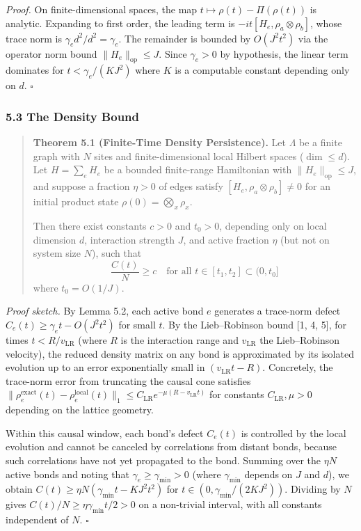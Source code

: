 \documentclass[
]{article}
\begin{document}
\emph{Proof.} On finite-dimensional spaces, the map
\(t \mapsto \rho(t) - \Pi(\rho(t))\) is analytic. Expanding to first
order, the leading term is \(-it[H_e, \rho_a \otimes \rho_b]\), whose
trace norm is \(\gamma_e d^2 / d^2 = \gamma_e\). The remainder is
bounded by \(O(J^2 t^2)\) via the operator norm bound
\(\|H_e\|_{\text{op}} \leq J\). Since \(\gamma_e > 0\) by hypothesis,
the linear term dominates for \(t < \gamma_e / (KJ^2)\) where \(K\) is a
computable constant depending only on \(d\). \(\square\)

\subsubsection{5.3 The Density Bound}\label{the-density-bound}

\begin{quote}
\textbf{Theorem 5.1 (Finite-Time Density Persistence).} Let \(\Lambda\)
be a finite graph with \(N\) sites and finite-dimensional local Hilbert
spaces (\(\dim \leq d\)). Let \(H = \sum_e H_e\) be a bounded
finite-range Hamiltonian with \(\|H_e\|_{\text{op}} \leq J\), and
suppose a fraction \(\eta > 0\) of edges satisfy
\([H_e, \rho_a \otimes \rho_b] \neq 0\) for an initial product state
\(\rho(0) = \bigotimes_x \rho_x\).

Then there exist constants \(c > 0\) and \(t_0 > 0\), depending only on
local dimension \(d\), interaction strength \(J\), and active fraction
\(\eta\) (but not on system size \(N\)), such that
\[\frac{C(t)}{N} \geq c \quad \text{for all } t \in [t_1, t_2] \subset (0, t_0]\]
where \(t_0 = O(1/J)\).
\end{quote}

\emph{Proof sketch.} By Lemma 5.2, each active bond \(e\) generates a
trace-norm defect \(C_e(t) \geq \gamma_e t - O(J^2 t^2)\) for small
\(t\). By the Lieb--Robinson bound {[}1, 4, 5{]}, for times
\(t < R / v_{\text{LR}}\) (where \(R\) is the interaction range and
\(v_{\text{LR}}\) the Lieb--Robinson velocity), the reduced density
matrix on any bond is approximated by its isolated evolution up to an
error exponentially small in \((v_{\text{LR}} t - R)\). Concretely, the
trace-norm error from truncating the causal cone satisfies
\(\|\rho_e^{\text{exact}}(t) - \rho_e^{\text{local}}(t)\|_1 \leq C_{\text{LR}} e^{-\mu(R - v_{\text{LR}} t)}\)
for constants \(C_{\text{LR}}, \mu > 0\) depending on the lattice
geometry.

Within this causal window, each bond's defect \(C_e(t)\) is controlled
by the local evolution and cannot be canceled by correlations from
distant bonds, because such correlations have not yet propagated to the
bond. Summing over the \(\eta N\) active bonds and noting that
\(\gamma_e \geq \gamma_{\min} > 0\) (where \(\gamma_{\min}\) depends on
\(J\) and \(d\)), we obtain
\(C(t) \geq \eta N (\gamma_{\min} t - KJ^2 t^2)\) for
\(t \in (0, \gamma_{\min}/(2KJ^2))\). Dividing by \(N\) gives
\(C(t)/N \geq \eta \gamma_{\min} t / 2 > 0\) on a non-trivial interval,
with all constants independent of \(N\). \(\square\)
\end{document}
